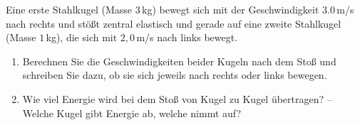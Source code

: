 \begin{ExerciseBlock}
Eine erste Stahlkugel (Masse $3\,$kg) bewegt sich mit der Geschwindigkeit $3.0\,$m/s nach rechts und stößt zentral elastisch und gerade auf eine zweite Stahlkugel (Masse $1\,$kg), die sich mit $2,0\,$m/s nach links bewegt.

\begin{enumerate}
	\item Berechnen Sie die Geschwindigkeiten beider Kugeln nach dem Stoß und schreiben Sie dazu, ob sie sich jeweils nach rechts oder links bewegen.

	\item Wie viel Energie wird bei dem Stoß von Kugel zu Kugel übertragen? – Welche Kugel gibt Energie ab, welche nimmt auf?
\end{enumerate}
\end{ExerciseBlock}
